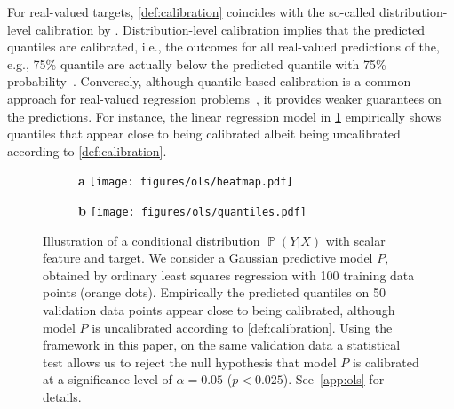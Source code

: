 \documentclass{article}
\DeclareMathOperator{\Prob}{\mathbb{P}}
\begin{document}
For real-valued targets, \cref{def:calibration} coincides with the
so-called distribution-level calibration by \citet{Song2019}.
Distribution-level calibration
implies that the predicted quantiles are calibrated, i.e., the outcomes for all
real-valued predictions of the, e.g., 75\% quantile are actually below the
predicted quantile with 75\% probability~\citep[Theorem~1]{Song2019}. Conversely,
although quantile-based calibration is a
common approach for real-valued regression
problems~\citep{Ho2005,Fasiolo2020,Rueda2006,Taillardat2016,Kuleshov2018},
it provides weaker guarantees on the predictions. For instance, the
linear regression model in \cref{fig:ols_motivation} empirically shows quantiles that
appear close to being calibrated albeit being uncalibrated according to \cref{def:calibration}.

\begin{figure}[!htb]
    \centering
    \begin{subfigure}[t]{0.62\textwidth}
        \centering
        \textbf{a}
        \texttt{[image: figures/ols/heatmap.pdf]}
    \end{subfigure}%
    \hfill%
    \begin{subfigure}[t]{0.38\textwidth}
        \centering
        \textbf{b}
        \texttt{[image: figures/ols/quantiles.pdf]}
    \end{subfigure}
    \caption{Illustration of a conditional distribution $\Prob(Y|X)$ with scalar
    feature and target. We consider a Gaussian predictive model $P$, obtained by
    ordinary least squares regression with 100 training data points (orange dots).
    Empirically the predicted quantiles on 50 validation data points appear close
    to being calibrated, although model $P$ is uncalibrated according to
    \cref{def:calibration}. Using the framework in this
    paper, on the same validation data a statistical test allows us to reject
    the null hypothesis that model $P$ is calibrated at a significance level of
    $\alpha = 0.05$ ($p < 0.025$). See~\cref{app:ols} for details.}%
    \label{fig:ols_motivation}
\end{figure}
\end{document}
